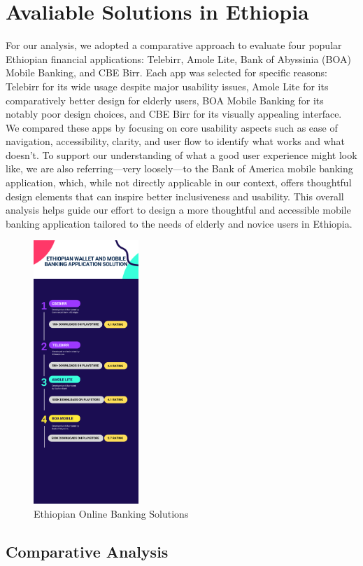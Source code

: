 \documentclass[a4paper,12pt]{report}
\begin{document}
\section{Avaliable Solutions in Ethiopia}
For our analysis, we adopted a comparative approach to evaluate four popular Ethiopian financial applications: Telebirr, Amole Lite, Bank of Abyssinia (BOA) Mobile Banking, and CBE Birr. Each app was selected for specific reasons: Telebirr for its wide usage despite major usability issues, Amole Lite for its comparatively better design for elderly users, BOA Mobile Banking for its notably poor design choices, and CBE Birr for its visually appealing interface. We compared these apps by focusing on core usability aspects such as ease of navigation, accessibility, clarity, and user flow to identify what works and what doesn't. To support our understanding of what a good user experience might look like, we are also referring—very loosely—to the Bank of America mobile banking application, which, while not directly applicable in our context, offers thoughtful design elements that can inspire better inclusiveness and usability. This overall analysis helps guide our effort to design a more thoughtful and accessible mobile banking application tailored to the needs of elderly and novice users in Ethiopia.


\begin{figure}[h]
  \centering
  \includegraphics[width=150px]{../images/infographics/apps_basic-statistics.png}
  \caption{Ethiopian Online Banking Solutions}
\end{figure}

\subsection{Comparative Analysis}
\end{document}
